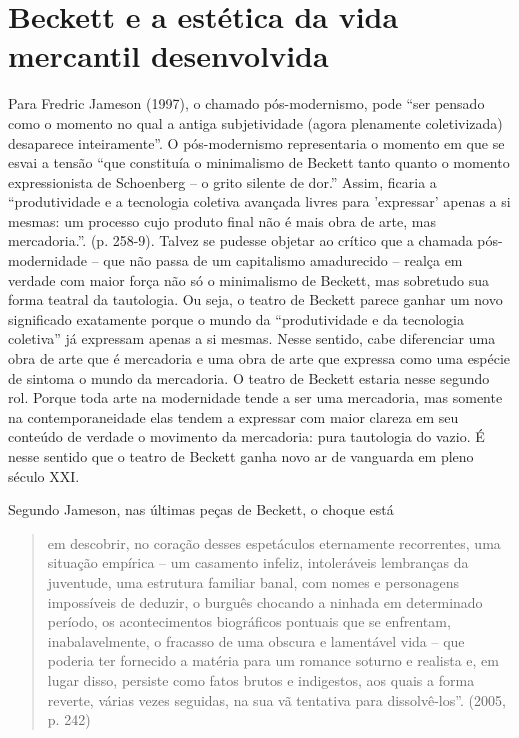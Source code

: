 \section{Beckett e a estética da vida mercantil desenvolvida}

Para Fredric Jameson (1997), o chamado pós-modernismo, pode ``ser
pensado como o momento no qual a antiga subjetividade (agora plenamente
coletivizada) desaparece inteiramente''. O pós-modernismo representaria
o momento em que se esvai a tensão ``que constituía o minimalismo de
Beckett tanto quanto o momento expressionista de Schoenberg -- o grito
silente de dor.'' Assim, ficaria a ``produtividade e a tecnologia
coletiva avançada livres para 'expressar' apenas a si mesmas: um
processo cujo produto final não é mais obra de arte, mas mercadoria.''.
(p. 258-9). Talvez se pudesse objetar ao crítico que a chamada
pós-modernidade -- que não passa de um capitalismo amadurecido -- realça
em verdade com maior força não só o minimalismo de Beckett, mas
sobretudo sua forma teatral da tautologia. Ou seja, o teatro de Beckett
parece ganhar um novo significado exatamente porque o mundo da
``produtividade e da tecnologia coletiva'' já expressam apenas a si
mesmas. Nesse sentido, cabe diferenciar uma obra de arte que é
mercadoria e uma obra de arte que expressa como uma espécie de sintoma o
mundo da mercadoria. O teatro de Beckett estaria nesse segundo rol.
Porque toda arte na modernidade tende a ser uma mercadoria, mas somente
na contemporaneidade elas tendem a expressar com maior clareza em seu
conteúdo de verdade o movimento da mercadoria: pura tautologia do vazio.
É nesse sentido que o teatro de Beckett ganha novo ar de vanguarda em
pleno século XXI.

Segundo Jameson, nas últimas peças de Beckett, o choque está

\begin{quote}
em descobrir, no coração desses espetáculos eternamente recorrentes, uma
situação empírica -- um casamento infeliz, intoleráveis lembranças da
juventude, uma estrutura familiar banal, com nomes e personagens
impossíveis de deduzir, o burguês chocando a ninhada em determinado
período, os acontecimentos biográficos pontuais que se enfrentam,
inabalavelmente, o fracasso de uma obscura e lamentável vida -- que
poderia ter fornecido a matéria para um romance soturno e realista e, em
lugar disso, persiste como fatos brutos e indigestos, aos quais a forma
reverte, várias vezes seguidas, na sua vã tentativa para dissolvê-los''.
(2005, p. 242)
\end{quote}

